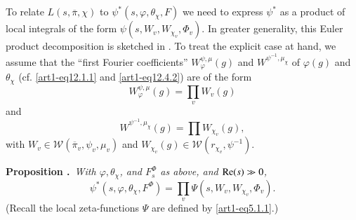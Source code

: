 \subsection{}\label{art1-sec13.1}
To relate $L(s,\overline{\pi},\chi)$ to $\psi^{*}(s,\varphi,\theta_{\chi},F)$ we need to express $\psi^{*}$ as a product of local integrals of the form $\psi(s,W_{v},W_{\chi_{v}},\Phi_{v})$. In greater generality, this Euler product decomposition is sketched in \cite{Piatetski-Shapiro}. To treat the explicit case at hand, we assume that the ``first Fourier coefficients'' $W^{\psi,\mu}_{\varphi}(g)$ and $W^{\psi^{-1},\mu_{\chi}}$ of $\varphi(g)$ and $\theta_{\chi}$ (cf. \eqref{art1-eq12.1.1} and \eqref{art1-eq12.4.2}) are of the form
$$
W^{\psi,\mu}_{\varphi}(g)=\prod\limits_{v}W_{v}(g)
$$
and
$$
W^{\psi^{-1},\mu_{\chi}}(g)=\prod W_{\chi_{v}}(g),
$$
with $W_{v}\in \mathscr{W}(\overline{\pi}_{v},\psi_{v},\mu_{v})$ and $W_{\chi_{v}}(g)\in \mathscr{W}(r_{\chi_{v}},\psi^{-1})$.

\medskip
\noindent
{\bf Proposition .\label{art1-prop13.2}}~{\em With $\varphi,\theta_{\chi}$, and $F^{\Phi}_{s}$ as above, and $\mathrm{Re}(s)\gg 0$,}
$$
\psi^{*}(s,\varphi,\theta_{\chi},F^{\Phi})=\prod\limits_{v}\Psi(s,W_{v},W_{\chi_{v}},\Phi_{v}).
$$
(Recall the local zeta-functions $\Psi$ are defined by \eqref{art1-eq5.1.1}.)

